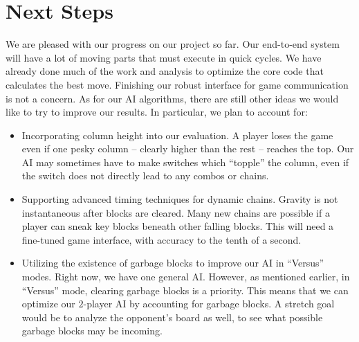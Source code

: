 \documentclass[10pt, final]{article}
\begin{document}
\section{Next Steps}
We are pleased with our progress on our project so far. Our end-to-end system will have a lot of moving parts that must execute in quick cycles. We have already done much of the work and analysis to optimize the core code that calculates the best move. Finishing our robust interface for game communication is not a concern. As for our AI algorithms, there are still other ideas we would like to try to improve our results. In particular, we plan to account for:
\begin{itemize}
\item Incorporating column height into our evaluation. A player loses the game even if one pesky column -- clearly higher than the rest -- reaches the top. Our AI may sometimes have to make switches which ``topple'' the column, even if the switch does not directly lead to any combos or chains.
\item Supporting advanced timing techniques for dynamic chains. Gravity is not instantaneous after blocks are cleared. Many new chains are possible if a player can sneak key blocks beneath other falling blocks. This will need a fine-tuned game interface, with accuracy to the tenth of a second.
\item Utilizing the existence of garbage blocks to improve our AI in ``Versus'' modes. Right now, we have one general AI. However, as mentioned earlier, in ``Versus'' mode, clearing garbage blocks is a priority. This means that we can optimize our $2$-player AI by accounting for garbage blocks. A stretch goal would be to analyze the opponent's board as well, to see what possible garbage blocks may be incoming.
\end{itemize}

\newpage
\end{document}
